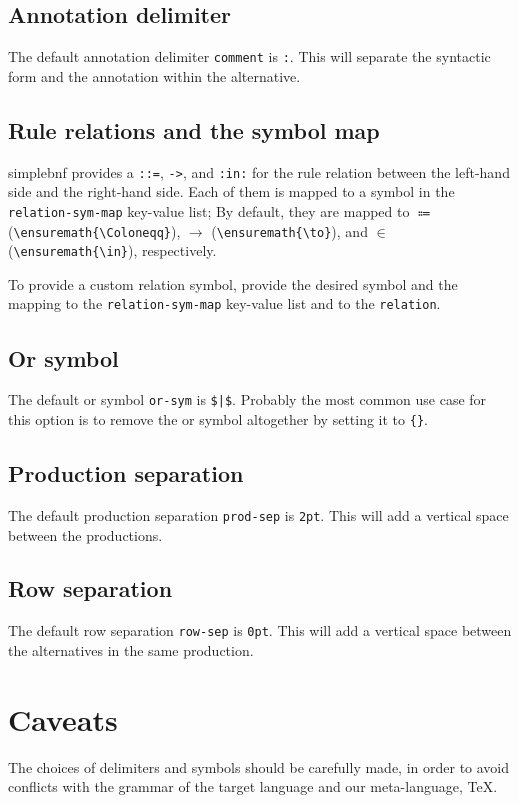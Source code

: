 \documentclass[11pt]{article}
\begin{document}
\subsection{Annotation delimiter}
The default annotation delimiter \verb/comment/ is \verb/:/.
This will separate the syntactic form and the annotation within the alternative.

\subsection{Rule relations and the symbol map}
\textsf{simplebnf} provides a \verb/::=/, \verb/->/, and \verb/:in:/ for the rule relation between the left-hand side and the right-hand side.
Each of them is mapped to a symbol in the \verb/relation-sym-map/ key-value list; By default, they are mapped to $\Coloneqq$ (\verb/\ensuremath{\Coloneqq}/), $\to$ (\verb/\ensuremath{\to}/), and $\in$ (\verb/\ensuremath{\in}/), respectively.

To provide a custom relation symbol, provide the desired symbol and the mapping to the \verb/relation-sym-map/ key-value list and to the \verb/relation/.

\subsection{Or symbol}
The default or symbol \verb/or-sym/ is \verb/$|$/.
Probably the most common use case for this option is to remove the or symbol altogether by setting it to \verb/{}/.

\subsection{Production separation}
The default production separation \verb/prod-sep/ is \verb/2pt/.
This will add a vertical space between the productions.

\subsection{Row separation}
The default row separation \verb/row-sep/ is \verb/0pt/.
This will add a vertical space between the alternatives in the same production.


\section{Caveats}
The choices of delimiters and symbols should be carefully made, in order to avoid conflicts with the grammar of the target language and our meta-language, \TeX{}.
\end{document}
